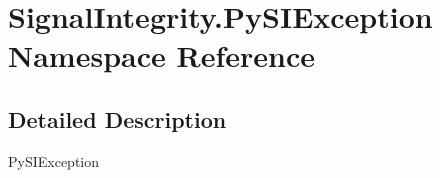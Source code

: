 \hypertarget{namespaceSignalIntegrity_1_1PySIException}{}\section{Signal\+Integrity.\+Py\+S\+I\+Exception Namespace Reference}
\label{namespaceSignalIntegrity_1_1PySIException}


\subsection{Detailed Description}
\begin{DoxyVerb}PySIException\end{DoxyVerb}
 